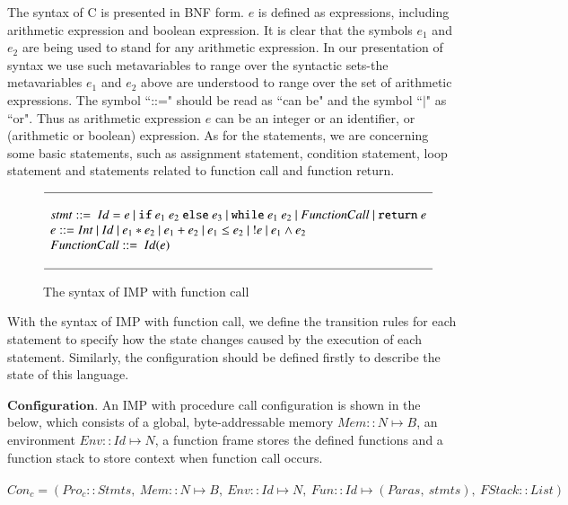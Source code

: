 \documentclass[letterpaper, 10 pt, conference]{IEEEtran}
\begin{document}
\par  The syntax of C is presented in BNF form. $e$ is defined as expressions, including arithmetic expression and boolean expression. It is clear that the symbols $e_1$ and $e_2$ are being used to stand for any arithmetic expression. In our presentation of syntax we use such metavariables to range over the syntactic sets-the metavariables $e_1$ and $e_2$ above are understood to range over the set of arithmetic expressions.  The symbol ``::=" should be read as ``can be" and the symbol ``$|$" as ``or". Thus as arithmetic expression $e$ can be an integer or an identifier, or (arithmetic or boolean) expression. As for the statements, we are concerning some basic statements, such as assignment statement, condition statement, loop statement and statements related to function call and function return.
\begin{figure}
\begin{displaymath}
\small
\begin{array}{l l l}
\hline\\
stmt ::=~Id=e ~|~ \texttt{if}~e_1~e_2~\texttt{else}~e_3 ~ |~ \texttt{while}~e_1~e_2 ~|~ FunctionCall ~|~ \texttt{return}~e \\
e ::=Int~|~Id~|~e_1*e_2~|~e_1+e_2~|~e_1\leq e_2~|~!e~|~e_1\land e_2\\
FunctionCall::=~Id(e)\\\\

\hline

\end{array}
\end{displaymath}
\caption{The syntax of IMP with function call}
\label{IMP-syntax}
\end{figure}
\par With the syntax of IMP with function call, we define the transition rules for each statement to specify how the state changes caused by the execution of each statement. Similarly, the configuration should be defined firstly to describe the state of this language.
\par $\textbf{Configuration.}$ An IMP with procedure call configuration is shown in the below, which consists of a global, byte-addressable memory $Mem::N\mapsto B$, an environment $Env::Id\mapsto N$, a function frame stores the defined functions and a function stack to store context when function call occurs. \\ \\

$Con_c=(Pro_c::Stmts,~Mem::N\mapsto B,~Env::Id\mapsto N,~Fun::Id\mapsto (Paras,~stmts),~FStack::List)$\\ \\
\end{document}
